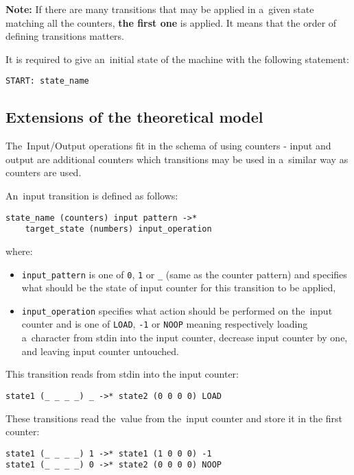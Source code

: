 \documentclass[english,shortabstract,mgr]{iithesis}
\begin{document}
\textbf{Note:} If there are many transitions that may be applied in a~given state
matching all the counters, \textbf{the first one} is applied. It means that the order
of defining transitions matters.

It is required to give an~initial state of the machine with the following statement:
\begin{verbatim}
START: state_name
\end{verbatim}

\subsection {Extensions of the theoretical model}

The~Input/Output operations fit in the schema of using counters - input and output
are additional counters which transitions may be used in a~similar way as counters are used.

An~input transition is defined as follows:
\begin{verbatim}
state_name (counters) input pattern ->*
    target_state (numbers) input_operation
\end{verbatim}

where:
\begin{itemize}
  \item \texttt{input\_pattern} is one of \texttt{0}, \texttt{1} or \texttt{\_}
      (same as the counter pattern) and specifies what should be the state
      of input counter for this transition to be applied,
  \item \texttt{input\_operation} specifies what action should be performed
      on the~input counter and is one of \texttt{LOAD}, \texttt{-1} or \texttt{NOOP}
      meaning respectively loading a~character from stdin into the input counter,
      decrease input counter by one, and leaving input counter untouched.
\end{itemize}

This transition reads from stdin into the input counter:
\begin{verbatim}
state1 (_ _ _ _) _ ->* state2 (0 0 0 0) LOAD
\end{verbatim}

These transitions read the~value from the~input counter and store it in the first counter:
\begin{verbatim}
state1 (_ _ _ _) 1 ->* state1 (1 0 0 0) -1
state1 (_ _ _ _) 0 ->* state2 (0 0 0 0) NOOP
\end{verbatim}
\end{document}

